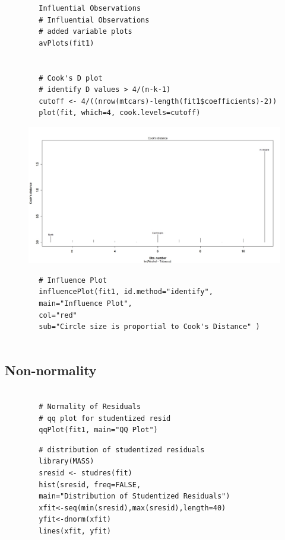 \documentclass[residuals.tex]{subfiles}
\begin{document}
	
	\bigskip
	\begin{framed}
		\begin{verbatim}
		Influential Observations
		# Influential Observations
		# added variable plots 
		avPlots(fit1)
		
		
		# Cook's D plot
		# identify D values > 4/(n-k-1) 
		cutoff <- 4/((nrow(mtcars)-length(fit1$coefficients)-2)) 
		plot(fit, which=4, cook.levels=cutoff)
		\end{verbatim}
	\end{framed}
	\begin{figure}
		\centering
		\includegraphics[width=0.7\linewidth]{alcotob6}
		\caption{}
		\label{fig:alcotob6}
	\end{figure}
	
	\bigskip
	\begin{framed}
		\begin{verbatim}
		# Influence Plot 
		influencePlot(fit1,	id.method="identify", 
		main="Influence Plot", 
		col="red"
		sub="Circle size is proportial to Cook's Distance" )
		
		\end{verbatim}
	\end{framed}
	\subsection*{Non-normality}
	
	\begin{framed}
		\begin{verbatim}
		
		# Normality of Residuals
		# qq plot for studentized resid
		qqPlot(fit1, main="QQ Plot")
		\end{verbatim}
	\end{framed}
	
	\begin{framed}
		\begin{verbatim}
		# distribution of studentized residuals
		library(MASS)
		sresid <- studres(fit) 
		hist(sresid, freq=FALSE, 
		main="Distribution of Studentized Residuals")
		xfit<-seq(min(sresid),max(sresid),length=40) 
		yfit<-dnorm(xfit) 
		lines(xfit, yfit)
		\end{verbatim}
	\end{framed}
\end{document}
